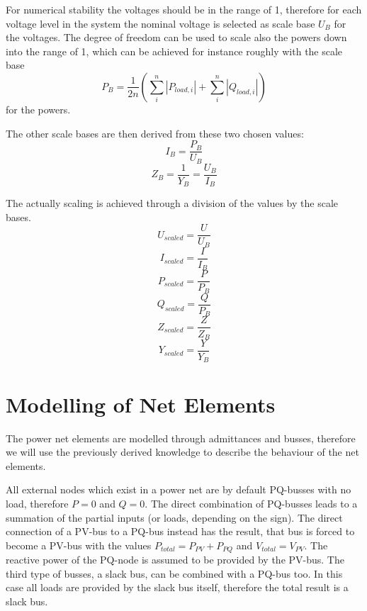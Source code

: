 For numerical stability the voltages should be in the range of 1, therefore for each voltage level in the system the nominal voltage is selected as scale base $U_B$ for the voltages. The degree of freedom can be used to scale also the powers down into the range of 1, which can be achieved for instance roughly with the scale base
\begin{equation}
	P_B = \frac{1}{2n} \left( \sum_{i}^n \left| P_{load,i} \right| + \sum_{i}^n \left| Q_{load,i} \right| \right)
\end{equation}
for the powers. 

The other scale bases are then derived from these two chosen values:
\begin{equation}
	I_B = \frac{P_B}{U_B}
\end{equation}
\begin{equation}
	Z_B = \frac{1}{Y_B} = \frac{U_B}{I_B}
\end{equation}

The actually scaling is achieved through a division of the values by the scale bases.
\begin{equation}
	U_{scaled} = \frac{U}{U_B}
\end{equation}
\begin{equation}
	I_{scaled} = \frac{I}{I_B}
\end{equation}
\begin{equation}
	P_{scaled} = \frac{P}{P_B}
\end{equation}
\begin{equation}
	Q_{scaled} = \frac{Q}{P_B}
\end{equation}
\begin{equation}
	Z_{scaled} = \frac{Z}{Z_B}
\end{equation}
\begin{equation}
	Y_{scaled} = \frac{Y}{Y_B}
	\label{eq:scaling_admittance}
\end{equation}

\section{Modelling of Net Elements}

The power net elements are modelled through admittances and busses, therefore we will use the previously derived knowledge to describe the behaviour of the net elements.

All external nodes which exist in a power net are by default PQ-busses with no load, therefore $P = 0$ and $Q = 0$. The direct combination of PQ-busses leads to a summation of the partial inputs (or loads, depending on the sign). The direct connection of a PV-bus to a PQ-bus instead has the result, that bus is forced to become a PV-bus with the values $P_{total} = P_{PV} + P_{PQ}$ and $V_{total} = V_{PV}$. The reactive power of the PQ-node is assumed to be provided by the PV-bus. The third type of busses, a slack bus, can be combined with a PQ-bus too. In this case all loads are provided by the slack bus itself, therefore the total result is a slack bus.

